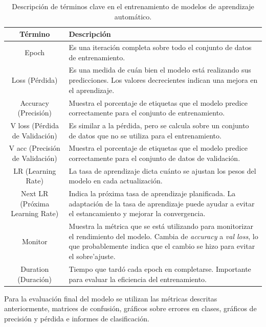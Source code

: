 \begin{table}[H]
   \centering
   \small
   \begin{tabular}{|c|p{10cm}|}
   \hline
   \textbf{Término} & \textbf{Descripción} \\
   \hline
   Epoch & Es una iteración completa sobre todo el conjunto de datos de entrenamiento. \\
   \hline
   Loss (Pérdida) & Es una medida de cuán bien el modelo está realizando sus predicciones. Los valores decrecientes indican una mejora en el aprendizaje. \\
   \hline
   Accuracy (Precisión) & Muestra el porcentaje de etiquetas que el modelo predice correctamente para el conjunto de entrenamiento. \\
   \hline
   V loss (Pérdida de Validación) & Es similar a la pérdida, pero se calcula sobre un conjunto de datos que no se utiliza para el entrenamiento. \\
   \hline
   V acc (Precisión de Validación) & Muestra el porcentaje de etiquetas que el modelo predice correctamente para el conjunto de datos de validación. \\
   \hline
   LR (Learning Rate) & La tasa de aprendizaje dicta cuánto se ajustan los pesos del modelo en cada actualización. \\
   \hline
   Next LR (Próxima Learning Rate) & Indica la próxima tasa de aprendizaje planificada. La adaptación de la tasa de aprendizaje puede ayudar a evitar el estancamiento y mejorar la convergencia. \\
   \hline
   Monitor & Muestra la métrica que se está utilizando para monitorizar el rendimiento del modelo. Cambia de \textit{accuracy} a \textit{val loss}, lo que probablemente indica que el cambio se hizo para evitar el sobre'ajuste. \\
   \hline
   Duration (Duración) & Tiempo que tardó cada epoch en completarse. Importante para evaluar la eficiencia del entrenamiento. \\
   \hline
   \end{tabular}
   \caption{Descripción de términos clave en el entrenamiento de modelos de aprendizaje automático.}
   \label{table:terminology}
   \end{table}

Para la evaluación final del modelo se utilizan las métricas descritas anteriormente, matrices de confusión, gráficos sobre errores en clases, gráficos de precisión y pérdida e informes de clasificación.